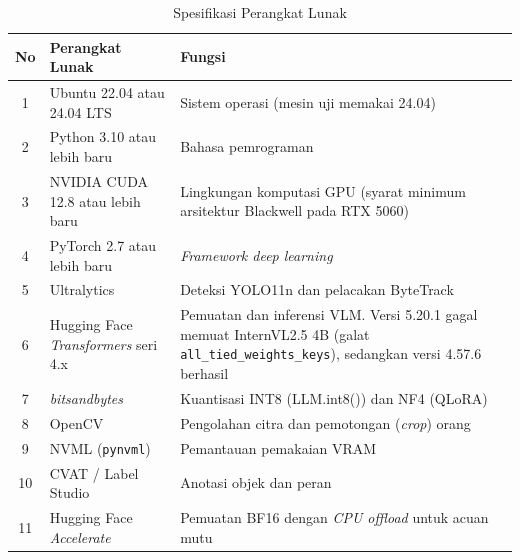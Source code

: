 \begin{table}[H]
    \centering
    \caption{Spesifikasi Perangkat Lunak}
    \label{tab:software}
    \renewcommand{\arraystretch}{1.3}
    \begin{tabular}{|c|p{4.5cm}|p{7.5cm}|}
    \hline
    \textbf{No} & \textbf{Perangkat Lunak} & \textbf{Fungsi} \\
    \hline
    1 & Ubuntu 22.04 atau 24.04 LTS & Sistem operasi (mesin uji memakai 24.04) \\
    \hline
    2 & Python 3.10 atau lebih baru & Bahasa pemrograman \\
    \hline
    3 & NVIDIA CUDA 12.8 atau lebih baru & Lingkungan komputasi GPU (syarat minimum arsitektur Blackwell pada RTX 5060) \\
    \hline
    4 & PyTorch 2.7 atau lebih baru & \textit{Framework deep learning} \\
    \hline
    5 & Ultralytics & Deteksi YOLO11n dan pelacakan ByteTrack \\
    \hline
    6 & Hugging Face \textit{Transformers} seri 4.x & Pemuatan dan inferensi VLM. Versi 5.20.1 gagal memuat InternVL2.5 4B (galat \texttt{all\_tied\_weights\_keys}), sedangkan versi 4.57.6 berhasil \\
    \hline
    7 & \textit{bitsandbytes} & Kuantisasi INT8 (LLM.int8()) dan NF4 (QLoRA) \\
    \hline
    8 & OpenCV & Pengolahan citra dan pemotongan (\textit{crop}) orang \\
    \hline
    9 & NVML (\texttt{pynvml}) & Pemantauan pemakaian VRAM \\
    \hline
    10 & CVAT / Label Studio & Anotasi objek dan peran \\
    \hline
    11 & Hugging Face \textit{Accelerate} & Pemuatan BF16 dengan \textit{CPU offload} untuk acuan mutu \\
    \hline
    \end{tabular}
\end{table}

